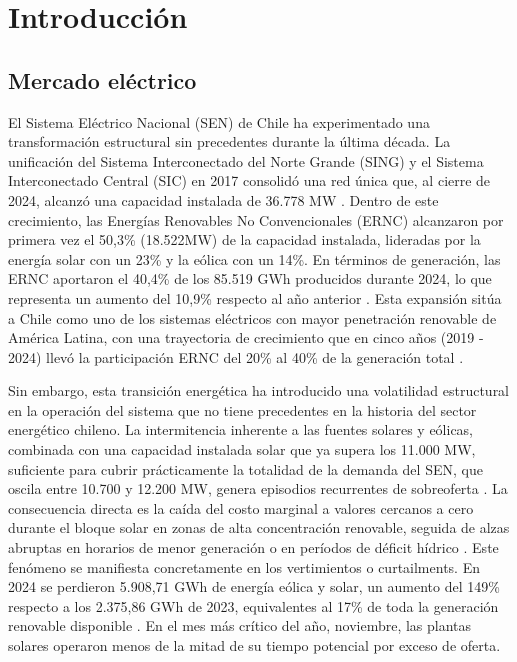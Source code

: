\chapter{Introducción}

\section{Mercado eléctrico}

El Sistema Eléctrico Nacional (SEN) de Chile ha experimentado una transformación estructural sin precedentes durante la última década. La unificación del Sistema Interconectado del Norte Grande (SING) y el Sistema Interconectado Central (SIC) en 2017 consolidó una red única que, al cierre de 2024, alcanzó una capacidad instalada de 36.778 MW \cite{CEN2024}. Dentro de este crecimiento, las Energías Renovables No Convencionales (ERNC) alcanzaron por primera vez el 50,3\% (18.522MW) de la capacidad instalada, lideradas por la energía solar con un 23\% y la eólica con un 14\%. En términos de generación, las ERNC aportaron el 40,4\% de los 85.519 GWh producidos durante 2024, lo que representa un aumento del 10,9\% respecto al año anterior \cite{CEN2024}. Esta expansión sitúa a Chile como uno de los sistemas eléctricos con mayor penetración renovable de América Latina, con una trayectoria de crecimiento que en cinco años (2019 - 2024) llevó la participación ERNC del 20\% al 40\% de la generación total \cite{LaTercera}.

Sin embargo, esta transición energética ha introducido una volatilidad estructural en la operación del sistema que no tiene precedentes en la historia del sector energético chileno. La intermitencia inherente a las fuentes solares y eólicas, combinada con una capacidad instalada solar que ya supera los 11.000 MW, suficiente para cubrir prácticamente la totalidad de la demanda del SEN, que oscila entre 10.700 y 12.200 MW, genera episodios recurrentes de sobreoferta \cite{LaTerceraPerdidas}. La consecuencia directa es la caída del costo marginal a valores cercanos a cero durante el bloque solar en zonas de alta concentración renovable, seguida de alzas abruptas en horarios de menor generación o en períodos de déficit hídrico \cite{REVE}. Este fenómeno se manifiesta concretamente en los vertimientos o curtailments. En 2024 se perdieron 5.908,71 GWh de energía eólica y solar, un aumento del 149\% respecto a los 2.375,86 GWh de 2023, equivalentes al 17\% de toda la generación renovable disponible \cite{LaTerceraPerdidas}. En el mes más crítico del año, noviembre, las plantas solares operaron menos de la mitad de su tiempo potencial por exceso de oferta.


